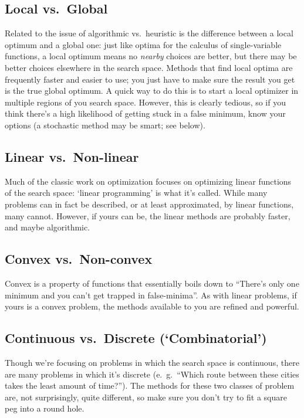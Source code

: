 \documentclass{article}
\begin{document}
  \subsection*{Local vs.\ Global}
		Related to the issue of algorithmic vs.\ heuristic is the difference 
		between a local optimum and a global one: 
		just like optima for the calculus of single-variable
		functions, a local optimum means no \emph{nearby} choices
		are better, but there may be better choices elsewhere in the search space.
		Methods that find local optima are frequently faster and easier to use;
		you just have to make sure the result you get is the true global
		optimum. A quick way to do this is to start a local optimizer in multiple
		regions of you search space. However, this is clearly tedious, so if you
		think there's a high likelihood of getting stuck in a false minimum,
		know your options (a stochastic method may be smart; see below).

  \subsection*{Linear vs.\ Non-linear}
		Much of the classic work on optimization focuses on optimizing
		linear functions of the search space: `linear programming' is
		what it's called. While many problems can in fact be described,
		or at least approximated, by linear functions, many cannot. However,
		if yours can be, the linear methods are probably faster, and maybe
		algorithmic.

  \subsection*{Convex vs.\ Non-convex}
		Convex is a property of functions that essentially boils down to 
		``There's only one minimum and you can't get trapped in false-minima''.
		As with linear problems, if yours is a convex problem, the methods
		available to you are refined and powerful.

  \subsection*{Continuous vs.\ Discrete (`Combinatorial')}
		Though we're focusing on problems in which the search space
		is continuous, there are many problems in which it's discrete
		(e.\ g.\ ``Which route between these cities takes the least
		amount of time?''). The methods for these two classes of 
		problem are, not surprisingly, quite different, so make sure you don't
		try to fit a square peg into a round hole. 
\end{document}
